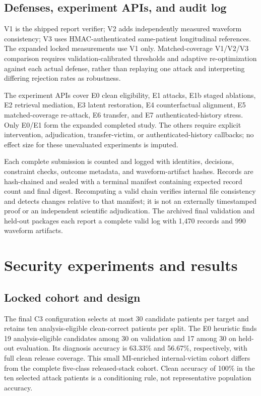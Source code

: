 \subsection{Defenses, experiment APIs, and audit log}
V1 is the shipped report verifier; V2 adds independently measured waveform consistency; V3 uses HMAC-authenticated same-patient longitudinal references. The expanded locked measurements use V1 only. Matched-coverage V1/V2/V3 comparison requires validation-calibrated thresholds and adaptive re-optimization against each actual defense, rather than replaying one attack and interpreting differing rejection rates as robustness.

The experiment APIs cover E0 clean eligibility, E1 attacks, E1b staged ablations, E2 retrieval mediation, E3 latent restoration, E4 counterfactual alignment, E5 matched-coverage re-attack, E6 transfer, and E7 authenticated-history stress. Only E0/E1 form the expanded completed study. The others require explicit intervention, adjudication, transfer-victim, or authenticated-history callbacks; no effect size for these unevaluated experiments is imputed.

Each complete submission is counted and logged with identities, decisions, constraint checks, outcome metadata, and waveform-artifact hashes. Records are hash-chained and sealed with a terminal manifest containing expected record count and final digest. Recomputing a valid chain verifies internal file consistency and detects changes relative to that manifest; it is not an externally timestamped proof or an independent scientific adjudication. The archived final validation and held-out packages each report a complete valid log with 1,470 records and 990 waveform artifacts.

\section{Security experiments and results}
\label{sec:securityresults}
\subsection{Locked cohort and design}
The final C3 configuration selects at most 30 candidate patients per target and retains ten analysis-eligible clean-correct patients per split. The E0 heuristic finds 19 analysis-eligible candidates among 30 on validation and 17 among 30 on held-out evaluation. Its diagnosis accuracy is 63.33\% and 56.67\%, respectively, with full clean release coverage. This small MI-enriched internal-victim cohort differs from the complete five-class released-stack cohort. Clean accuracy of 100\% in the ten selected attack patients is a conditioning rule, not representative population accuracy.

